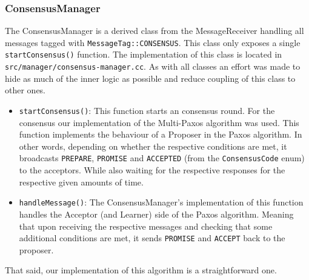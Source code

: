 \documentclass[11pt]{article}
\begin{document}
\subsubsection{ConsensusManager}
The ConsensusManager is a derived class from the MessageReceiver handling all
messages tagged with \texttt{MessageTag::CONSENSUS}. This class only exposes a
single \texttt{startConsensus()} function. The implementation of this class is
located in \texttt{src/manager/consensus-manager.cc}. As with all classes an
effort was made to hide as much of the inner logic as possible and reduce
coupling of this class to other ones.\\
\begin{itemize}
\item \texttt{startConsensus()}: This function starts an consensus round. For the
consensus our implementation of the Multi-Paxos algorithm was used. This
function implements the behaviour of a Proposer in the Paxos algorithm. In other
words, depending on whether the respective conditions are met, it broadcasts
\texttt{PREPARE}, \texttt{PROMISE} and \texttt{ACCEPTED} (from the
\texttt{ConsensusCode} enum) to the acceptors.  While also waiting for the
respective responses for the respective given amounts of time.\\
\item \texttt{handleMessage()}: The ConsensusManager's implementation of this
  function handles the Acceptor (and Learner) side of the Paxos
  algorithm. Meaning that upon receiving the respective messages and checking
  that some additional conditions are met, it sends \texttt{PROMISE} and
  \texttt{ACCEPT} back to the proposer.\\
\end{itemize}
That said, our implementation of this algorithm is a straightforward one.
\end{document}
